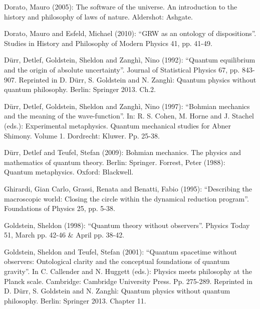 \documentclass[12pt]{article}
\theoremstyle{definition}
\begin{document}
{\vspace{0.3cm}   \noindent  Dorato, Mauro (2005): The software of the universe. An introduction to the history and philosophy of laws of nature. Aldershot: Ashgate. 

\vspace{0.3cm}   \noindent  Dorato, Mauro and Esfeld, Michael (2010): ``GRW as an ontology of dispositions''. Studies in History and Philosophy of Modern Physics 41, pp. 41-49. 

\vspace{0.3cm}   \noindent  D\"urr, Detlef, Goldstein, Sheldon and Zangh\`i, Nino (1992): ``Quantum equilibrium and the origin of absolute uncertainty''. Journal of Statistical Physics 67, pp. 843-907. Reprinted in D. D\"urr, S. Goldstein and N. Zangh\`i: Quantum physics without quantum philosophy. Berlin: Springer 2013. Ch.2.

\vspace{0.3cm}   \noindent  D\"urr, Detlef, Goldstein, Sheldon and Zangh\`i, Nino (1997): ``Bohmian mechanics and the meaning of the wave-function''. In: R. S. Cohen, M. Horne and J. Stachel (eds.): Experimental metaphysics. Quantum mechanical studies for Abner Shimony. Volume 1. Dordrecht: Kluwer. Pp. 25-38. 

\vspace{0.3cm}   \noindent  D\"urr, Detlef and Teufel, Stefan (2009): Bohmian mechanics. The physics and mathematics of quantum theory. Berlin: Springer.
Forrest, Peter (1988): Quantum metaphysics. Oxford: Blackwell.

\vspace{0.3cm}   \noindent  Ghirardi, Gian Carlo, Grassi, Renata and Benatti, Fabio (1995): ``Describing the macroscopic world: Closing the circle within the dynamical reduction program''. Foundations of Physics 25, pp. 5-38.

\vspace{0.3cm}   \noindent  Goldstein, Sheldon (1998): ``Quantum theory without observers''. Physics Today 51, March pp. 42-46 \& April pp. 38-42. 

\vspace{0.3cm}   \noindent  Goldstein, Sheldon and Teufel, Stefan (2001): ``Quantum spacetime without observers: Ontological clarity and the conceptual foundations of quantum gravity''. In C. Callender and N. Huggett (eds.): Physics meets philosophy at the Planck scale. Cambridge: Cambridge University Press. Pp. 275-289. Reprinted in D. D\"urr, S. Goldstein and N. Zangh\`i: Quantum physics without quantum philosophy. Berlin: Springer 2013. Chapter 11.

}
\end{document}
